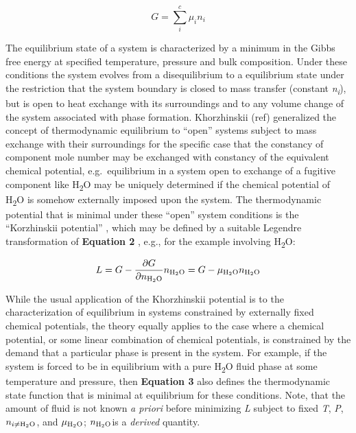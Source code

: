 \documentclass[11pt, titlepage, twoside]{article}
\begin{document}
\begin{MPEquation}[!ht]
\begin{equation}
G = \sum\limits_i^c {{\mu _i}{n_i}}
\end{equation}
\label{MPEquationElement:DE19C888-9CE1-4F06-8E66-A814195E784E}
\end{MPEquation}
The equilibrium state of a system is characterized by a minimum in the Gibbs free energy at specified temperature, pressure and bulk composition. Under these conditions the system evolves from a disequilibrium to a equilibrium state under the restriction that the system boundary is closed to mass transfer (constant \emph{n\textsubscript{i}}), but is open to heat exchange with its surroundings and to any volume change of the system associated with phase formation. Khorzhinskii (ref) generalized the concept of thermodynamic equilibrium to ``open'' systems subject to mass exchange with their surroundings for the specific case that the constancy of component mole number may be exchanged with constancy of the equivalent chemical potential, e.g.\ equilibrium in a system open to exchange of a fugitive component like H\textsubscript{2}O may be uniquely determined if the chemical potential of H\textsubscript{2}O is somehow externally imposed upon the system. The thermodynamic potential that is minimal under these ``open'' system conditions is the ``Korzhinskii potential'' \cite{GhKe87}, which may be defined by a suitable Legendre transformation of \textbf{Equation 2} , e.g., for the example involving H\textsubscript{2}O:


\begin{MPEquation}[!ht]
\begin{equation}
L = G - \frac{{\partial G}}{{\partial {n_{{{\rm{H}}_{\rm{2}}}{\rm{O}}}}}}{n_{{{\rm{H}}_{\rm{2}}}{\rm{O}}}} = G - {\mu _{{{\rm{H}}_{\rm{2}}}{\rm{O}}}}{n_{{{\rm{H}}_{\rm{2}}}{\rm{O}}}}
\end{equation}
\label{MPEquationElement:FDBB0D6C-309E-44BB-949D-00FB4253B16B}
\end{MPEquation}
While the usual application of the Khorzhinskii potential is to the characterization of equilibrium in systems constrained by externally fixed chemical potentials, the theory equally applies to the case where a chemical potential, or some linear combination of chemical potentials, is constrained by the demand that a particular phase is present in the system. For example, if the system is forced to be in equilibrium with a pure H\textsubscript{2}O fluid phase at some temperature and pressure, then \textbf{Equation 3} also defines the thermodynamic state function that is minimal at equilibrium for these conditions. Note, that the amount of fluid is not known \emph{a priori }before minimizing \emph{L} subject to fixed \emph{T}, \emph{P}, ${n_{i \ne {{\rm{H}}_{\rm{2}}}{\rm{O}}}}$, and ${\mu _{{{\rm{H}}_{\rm{2}}}{\rm{O}}}}$; ${n_{{{\rm{H}}_{\rm{2}}}{\rm{O}}}}$is a \emph{derived} quantity.
\end{document}
